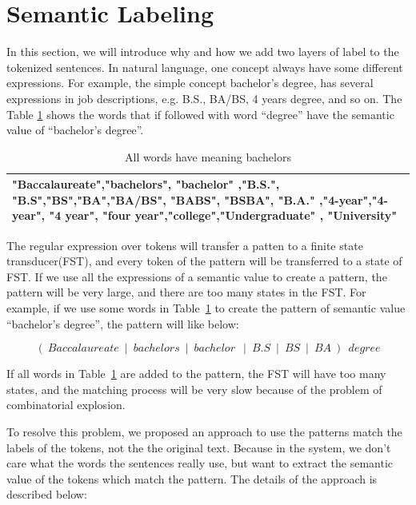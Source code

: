 \section{Semantic Labeling}

In this section, we will introduce why and how we add two layers of label to the tokenized sentences. In natural language, one concept always have some different expressions. For example, the simple concept bachelor's degree,  has several expressions in job descriptions, e.g. B.S., BA/BS, 4 years degree, and so on. The Table \ref{tab:multispelling} shows the words that if followed with word ``degree'' have the semantic value of ``bachelor's degree''.

\begin{table}[ht]
\caption{All words have meaning bachelors } %
\centering %
\begin{tabular}{  | p{15cm} |  }
 \hline
 "Baccalaureate","bachelors", "bachelor" ,"B.S.", "B.S","BS","BA","BA/BS", "BABS", "BSBA", "B.A." ,"4-year","4-year", "4 year", "four year","college","Undergraduate" , "University" \\
  \hline
\end{tabular}
\label{tab:multispelling} %
\end{table}

The regular expression over tokens will transfer a patten to a finite state transducer(FST), and every token of the pattern will be transferred to a state of FST. If we use all the expressions of a semantic value to create a pattern, the pattern will be very large, and there are too many states in the FST. For example, if we use some words in Table~\ref{tab:multispelling} to create the pattern of semantic value ``bachelor's degree'', the pattern will like below:

$$ (~Baccalaureate~\mid~bachelors~\mid~bachelor~~\mid~B.S~\mid~BS~\mid~BA~)~~degree $$

If all words in Table~\ref{tab:multispelling} are added to the pattern, the FST will have too many states, and the matching process will be very slow because of the problem of combinatorial explosion.

To resolve this problem, we proposed an approach to use the patterns match the labels of the tokens, not the the original text. Because in the system, we don't care what the words the sentences really use, but want to extract the semantic value of the tokens which match the pattern. The details of the approach is described below:  

